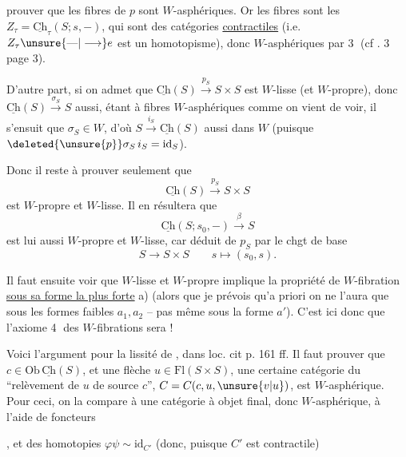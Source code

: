 

prouver que les fibres de $p$ sont $W$-asphériques. Or les fibres sont les $Z_\tau=\underline{\mathrm{Ch}}_\tau(S;s,-)$, qui sont des catégories \uline{contractiles} (i.e. $Z_\tau\unsure{\text{---}|\longrightarrow}e$ est un homotopisme), donc $W$-asphériques par \textcircled{3} (cf . 3 page 3).

D'autre part,  si on admet que $\underline{\mathrm{Ch}}(S)\xrightarrow{p_S}S\times S$ est $W$-lisse (et $W$-propre), donc $\underline{\mathrm{Ch}}(S)\xrightarrow{\sigma_S}S$ aussi, étant à fibres $W$-asphériques comme on vient de voir, il s'ensuit que $\sigma_S\in W$, d'où $S\xrightarrow{i_S}\underline{\mathrm{Ch}}(S)$ aussi dans $W$ (puisque $\deleted{\unsure{p}}\sigma_S\,i_S=\mathrm{id}_S$).


Donc il reste à prouver seulement que
\[
\underline{\mathrm{Ch}}(S)\xrightarrow{p_S}S\times S \tag*{(a)}
\]
est $W$-propre et $W$-lisse. Il en résultera que
\[
\underline{\mathrm{Ch}}(S;s_0,-)\xrightarrow{\beta}S
\]
est lui aussi $W$-propre et $W$-lisse, car déduit de $p_S$ par le chgt de base
\[
S\longrightarrow S\times S\qquad s\longmapsto(s_0,s).
\]

Il faut ensuite voir que  $W$-lisse et $W$-propre implique la propriété de $W$-fibration \uline{sous sa forme la plus forte} a) (alors que je prévois qu'a priori on ne l'aura que sous les formes faibles $a_1,a_2$ -- pas même sous la forme $a'$). C'est ici donc que l'axiome \textcircled{4} des $W$-fibrations sera  !


Voici l'argument pour la lissité de , dans loc. cit p. 161 ff. Il faut prouver que   $c\in\mathrm{Ob}\,\underline{\mathrm{Ch}}(S)$,  et une flèche $u\in\mathrm{Fl}(S\times S)$, une certaine catégorie du ``relèvement de $u$ de source $c$'', $C=C(c,u,\unsure{v|u})$, est $W$-asphérique. Pour ceci, on la compare à une catégorie  à objet final, donc  $W$-asphérique, à l'aide de  foncteurs


, et des homotopies $\varphi\psi\sim\mathrm{id}_{C'}$ (donc, puisque $C'$ est contractile)
